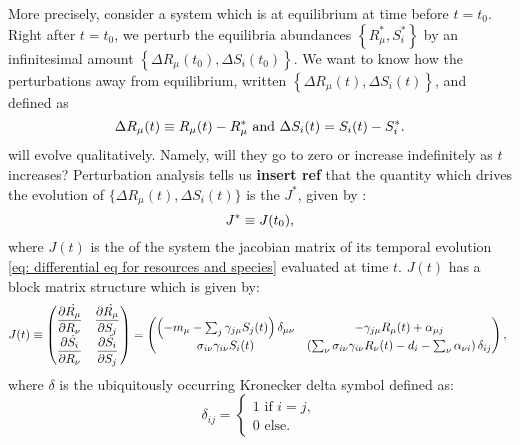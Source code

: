 \documentclass[12pt, titlepage]{report}
\begin{document}
More precisely, consider a system which is at equilibrium at time before $t=t_0$. Right after $t=t_0$, we perturb the equilibria abundances $\left\{R_\mu^*, S_i^*\right\}$ by an infinitesimal amount $\left\{ \Delta R_\mu(t_0), \Delta S_i(t_0) \right\}$.
We want to know how the perturbations away from equilibrium, written $\left\{ \Delta R_\mu(t), \Delta S_i(t) \right\}$, and defined as
\begin{equation}
\Delta R_\mu(t)\equiv R_\mu(t)-R_\mu^* \text{ and } \Delta S_i(t) = S_i(t)-S_i^*.
\end{equation}
will evolve qualitatively. Namely, will they go to zero or increase indefinitely as $t$ increases? Perturbation analysis tells us \textbf{insert ref} that the quantity which drives the evolution of $\{ \Delta R_\mu(t), \Delta S_i(t)\}$
is the  $J^*$, given by :
\begin{equation}
J^* \equiv J(t_0),
\end{equation}
where $J(t)$ is the  of the system \ie the jacobian matrix of its temporal evolution \eqref{eq: differential eq for resources and species} evaluated at time $t$. $J(t)$ has a block matrix structure which is given by:
\begin{equation}
  J(t) \defined
\begin{pmatrix}
  \partiald{\dot{R_\mu}}{R_\nu}& \partiald{\dot{R_\mu}}{S_j} \\
  \partiald{\dot{S_i}}{R_\nu} & \partiald{\dot{S_i}}{S_j}
\end{pmatrix}
=
\begin{pmatrix}
  \left(-m_\mu-\sum_j \gamma_{j\mu}S_j(t)\right)\delta_{\mu\nu} & -\gamma_{j\mu}R_\mu(t)+\alpha_{\mu j} \\
  \sigma_{i\nu}\gamma_{i\nu}S_i(t) &\left(\sum_{\nu} \sigma_{i\nu}\gamma_{i\nu}R_\nu(t)-d_i-\sum_\nu \alpha_{\nu i}\right)\delta_{ij}
\end{pmatrix}, \label{eq: definition of jacobian}
\end{equation}
where $\delta$ is the ubiquitously occurring Kronecker delta symbol defined as:
\begin{equation}
\delta_{ij} =
\begin{cases}
1 \text{ if }i=j, \\
0 \text{ else.}
\end{cases}
\end{equation}
\end{document}
